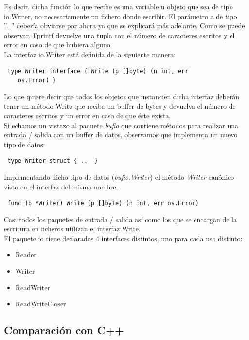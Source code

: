 	Es decir, dicha función lo que recibe es una variable u objeto que sea de
	tipo io.Writer, no necesariamente un fichero donde escribir. El parámetro
	a de tipo ''...'' debería obviarse por ahora ya que se explicará más
	adelante. Como se puede observar, Fprintf devuelve una tupla con el número
	de caracteres escritos y el error en caso de que hubiera alguno.\\
	
	La interfaz io.Writer está definida de la siguiente manera:
	
	\begin{verbatim} type Writer interface { Write (p []byte) (n int, err
	os.Error) } \end{verbatim}
	
	Lo que quiere decir que todos los objetos que instancien dicha interfaz
	deberán tener un método Write que reciba un buffer de bytes y devuelva el
	número de caracteres escritos y un error en caso de que éste exista.\\
	
	Si echamos un vistazo al paquete \textit{bufio} que contiene métodos para
	realizar una entrada / salida con un buffer de datos, observamos que
	implementa un nuevo tipo de datos:

	\begin{verbatim} type Writer struct { ... } \end{verbatim}
	
	Implementando dicho tipo de datos (\textit{bufio.Writer}) el método
	\textit{Writer} canónico visto en el interfaz del mismo nombre.
	
	\begin{verbatim} func (b *Writer) Write (p []byte) (n int, err os.Error)
	\end{verbatim}
	
	Casi todos los paquetes de entrada / salida así como los que se encargan de
	la escritura en ficheros utilizan el interfaz Write. \\
	
	El paquete io tiene declarados 4 interfaces distintos, uno para cada uso
	distinto:
	
	\begin{itemize} \item Reader \item Writer \item ReadWriter \item
	ReadWriteCloser \end{itemize}
	
	\subsection{Comparación con C++}
	
